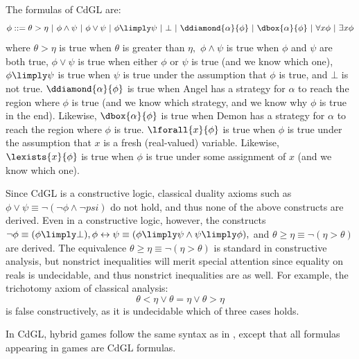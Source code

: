 \documentclass[12pt]{cmuthesis}
\theoremstyle{definition}
\theoremstyle{remark}
\newcommand{\bebecomes}{\mathrel{::=}}
\newcommand{\alternative}{~|~}
\newcommand{\lequiv}{\leftrightarrow}
\newcommand{\CdGL}{\textsf{CdGL}\xspace}
\begin{document}
The formulas of \CdGL are:
\[\phi \bebecomes \theta > \eta \alternative  \phi \land \psi \alternative \phi \lor \psi \alternative \phi \limply \psi \alternative \bot \alternative \ddiamond{\alpha}{\phi} \alternative \dbox{\alpha}{\phi} \alternative \forall{x}{\phi} \alternative \exists{x}{\phi}\]
where $\theta > \eta$ is true when $\theta$ is greater than $\eta,$ $\phi \land \psi$ is true when $\phi$ and $\psi$ are both true, $\phi \lor \psi$ is true when either $\phi$ or $\psi$ is true (and we know which one), $\phi \limply \psi$ is true when $\psi$ is true under the assumption that $\phi$ is true, and $\bot$ is not true.
$\ddiamond{\alpha}{\phi}$ is true when Angel has a strategy for $\alpha$ to reach the region where $\phi$ is true (and we know which strategy, and we know why $\phi$ is true in the end).
Likewise, $\dbox{\alpha}{\phi}$ is true when Demon has a strategy for $\alpha$ to reach the region where $\phi$ is true.
$\lforall{x}{\phi}$ is true when $\phi$ is true under the assumption that $x$ is a fresh (real-valued) variable.
Likewise, $\lexists{x}{\phi}$ is true when $\phi$ is true under some assignment of $x$ (and we know which one).

Since \CdGL is a constructive logic, classical duality axioms such as $\phi \lor \psi \equiv \neg(\neg \phi \land \neg psi)$ do not hold, and thus none of the above constructs are derived.
Even in a constructive logic, however, the constructs $\neg \phi \equiv (\phi \limply \bot), \phi \lequiv \psi \equiv (\phi \limply \psi \land \psi \limply \phi),$ and $\theta \geq \eta \equiv \neg(\eta > \theta)$ are derived.
The equivalence $\theta \geq \eta \equiv \neg(\eta > \theta)$ is standard in constructive analysis, but nonstrict inequalities will merit special attention since equality on reals is undecidable, and thus nonstrict inequalities are as well.
For example, the trichotomy axiom of classical analysis:
\[\theta < \eta \lor \theta = \eta \lor \theta > \eta\]
is false constructively, as it is undecidable which of three cases holds.

In \CdGL, hybrid games follow the same syntax as in \dGL, except that all formulas appearing in games are \CdGL formulas.
\end{document}
